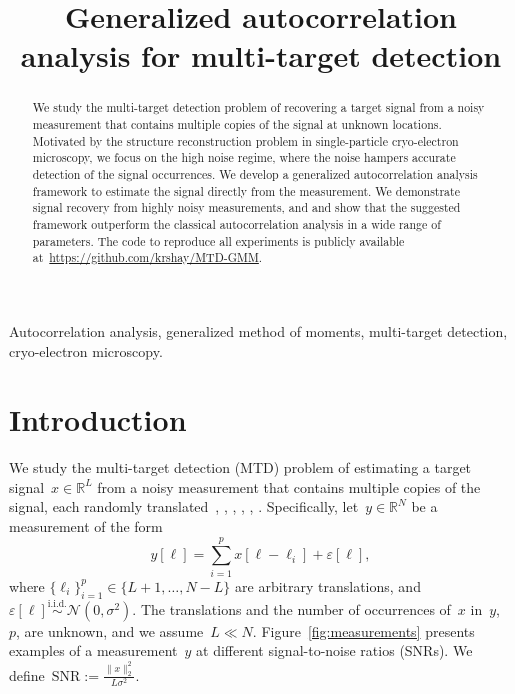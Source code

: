 \documentclass{article}
\title{Generalized autocorrelation analysis for multi-target detection}
\begin{document}
%
\maketitle
%
\begin{abstract}
We study the multi-target detection problem of recovering a target signal from a noisy measurement that contains multiple copies of the signal at unknown locations. Motivated by the structure reconstruction problem in single-particle cryo-electron microscopy, we focus on the high noise regime, where the noise hampers accurate detection of the signal occurrences. We develop a generalized autocorrelation analysis framework to estimate the signal directly from the measurement. We demonstrate signal recovery from highly noisy measurements, and and show that the suggested framework outperform the classical autocorrelation analysis in a wide range of parameters. The code to reproduce all experiments is publicly available at~\url{https://github.com/krshay/MTD-GMM}.
\end{abstract}
%
\begin{keywords}
Autocorrelation analysis, generalized method of moments, multi-target detection, cryo-electron microscopy.
\end{keywords}
%
\section{Introduction}
\label{sec:intro}
We study the multi-target detection (MTD) problem of estimating a target signal~$x \in \mathbb{R}^L$ from a noisy measurement that contains multiple copies of the signal, each randomly translated~\cite{bendory2019multi}, \cite{lan2020multi}, \cite{marshall2020image}, \cite{bendory2021multi}, \cite{kreymer2021two}, \cite{bendory2018toward}. Specifically, let~$y \in \mathbb{R}^N$ be a measurement of the form
\begin{equation}
\label{eq:model}
y[\ell] = \sum_{i=1}^{p} x[\ell - \ell_i] + \varepsilon[\ell],
\end{equation}
where \mbox{$\{\ell_i\}_{i=1}^{p} \in \{L + 1, \ldots, N-L\}$} are arbitrary translations, and~$\varepsilon[\ell]\overset{\text{i.i.d.}}{\sim} \mathcal{N}(0,\sigma^2)$. The translations and the number of occurrences of~$x$ in~$y$,~$p$, are unknown, and we assume~$L \ll N$. Figure~\ref{fig:measurements} presents examples of a measurement~$y$ at different signal-to-noise ratios (SNRs). We define~\mbox{$\text{SNR} := \frac{\|x\|_2^2}{L \sigma^2}$}.
\end{document}
